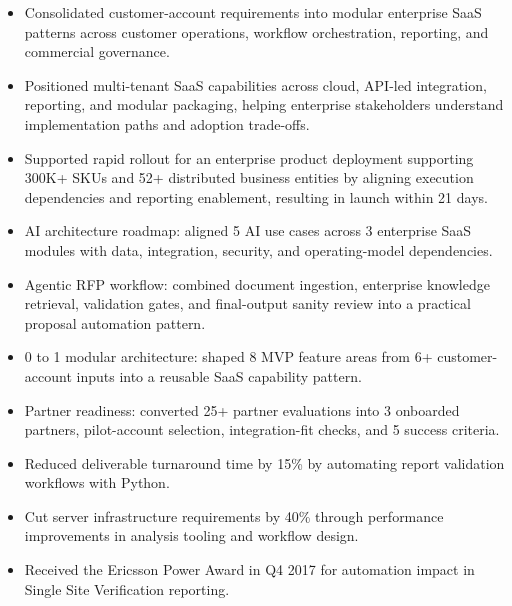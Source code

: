 \documentclass[10pt]{article}
\begin{document}
\begin{itemize}
  \item Consolidated customer-account requirements into modular enterprise SaaS patterns across customer operations, workflow orchestration, reporting, and commercial governance.
  \item Positioned multi-tenant SaaS capabilities across cloud, API-led integration, reporting, and modular packaging, helping enterprise stakeholders understand implementation paths and adoption trade-offs.
  \item Supported rapid rollout for an enterprise product deployment supporting 300K+ SKUs and 52+ distributed business entities by aligning execution dependencies and reporting enablement, resulting in launch within 21 days.
\end{itemize}

\begin{itemize}
  \item AI architecture roadmap: aligned 5 AI use cases across 3 enterprise SaaS modules with data, integration, security, and operating-model dependencies.
  \item Agentic RFP workflow: combined document ingestion, enterprise knowledge retrieval, validation gates, and final-output sanity review into a practical proposal automation pattern.
  \item 0 to 1 modular architecture: shaped 8 MVP feature areas from 6+ customer-account inputs into a reusable SaaS capability pattern.
  \item Partner readiness: converted 25+ partner evaluations into 3 onboarded partners, pilot-account selection, integration-fit checks, and 5 success criteria.
\end{itemize}

\begin{itemize}
  \item Reduced deliverable turnaround time by 15\% by automating report validation workflows with Python.
  \item Cut server infrastructure requirements by 40\% through performance improvements in analysis tooling and workflow design.
  \item Received the Ericsson Power Award in Q4 2017 for automation impact in Single Site Verification reporting.
\end{itemize}
\end{document}
